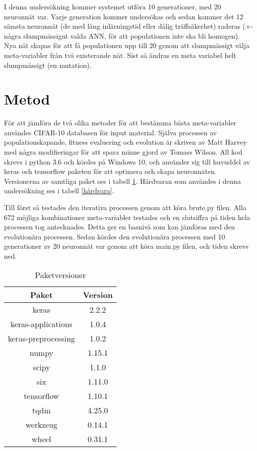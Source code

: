 \documentclass[a4paper, 12pt]{article}
\begin{document}
    I denna undersökning kommer systemet utföra 10 generationer, med 20 neuronnät var. Varje generation kommer undersökas och sedan kommer det 12 sämsta neuronnät (de med lång inlärningstid eller dålig träffsäkerhet) raderas (+- några slumpmässignt valda ANN, för att populationen inte ska bli homogen). Nya nät skapas för att få populationen upp till 20 genom att slumpmässigt välja meta-variabler från två existerande nät. Sist så ändras en meta variabel helt slumpmässigt (en mutation).

  \section{Metod}
  För att jämföra de två olika metoder för att bestämma bästa meta-variabler användes CIFAR-10 databasen för input material. Själva processen av populationskapande, fitness evaluering och evolution är skriven av Matt Harvey \parencite{harvey2017} med några modifieringar för att spara minne gjord av Tomass Wilson. All kod skrevs i python 3.6 och kördes på Windows 10, och använder sig till huvuddel av keras och tensorflow paketen för att optimera och skapa neuronnäten. Versionerna av samtliga paket ses i tabell \ref{paketversioner}. Hårdvaran som användes i denna undersökning ses i tabell \ref{hårdvara}.

  Till först så testades den iterativa processen genom att köra brute.py filen. Alla 672 möjliga kombinationer meta-variabler testades och en slutsiffra på tiden hela processen tog antecknades. Detta ger en basnivå som kan jämföras med den evolutionära processen. Sedan kördes den evolutionära processen med 10 generationer av 20 neuronnät var genom att köra main.py filen, och tiden skrevs ned.

\begin{table}[htb]
    \centering
    \begin{tabular}{c|c}
      Paket & Version \\
      \hline
      keras & 2.2.2 \\
      keras-applications & 1.0.4 \\
      keras-preprocessing & 1.0.2 \\
      numpy & 1.15.1 \\
      scipy & 1.1.0 \\
      six & 1.11.0 \\
      tensorflow & 1.10.1 \\
      tqdm & 4.25.0 \\
      werkzeug & 0.14.1 \\
      wheel & 0.31.1
    \end{tabular}
    \caption{Paketversioner}
    \label{paketversioner}
\end{table}
\end{document}
